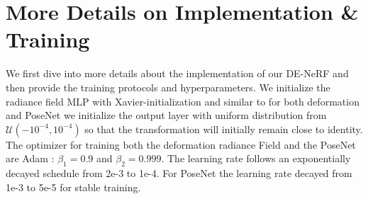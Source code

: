 \documentclass[10pt,twocolumn,letterpaper]{article}
\begin{document}


\begin{table}[h]
\vspace{1mm}
\caption{\textbf{Training Protocol.} Training from scratch provide better results with more accurate pose initialization but for inaccurate pose initialization training PoseNet as finetuning after a first round of training performs better.
}
\label{tab:training_protocal}
\end{table}

\section{More Details on Implementation \& Training}

We first dive into more details about the implementation of our DE-NeRF and then provide the training protocols and hyperparameters.%
We initialize the radiance field MLP with Xavier-initialization and similar to \cite{park2021nerfies} for both deformation and PoseNet we initialize the output layer with uniform distribution from $ \mathcal{U}( -10^{-4},10^{-4} )$ so that the transformation will initially remain close to identity.
The optimizer for training both the deformation radiance Field and the PoseNet are Adam \cite{kingma2014adam}: $\beta_1 = 0.9$ and $\beta_2 = 0.999$. The learning rate 
follows an exponentially decayed schedule from 2e-3 to 1e-4. For PoseNet the learning rate decayed from 1e-3 to 5e-5 for stable training.
\end{document}
